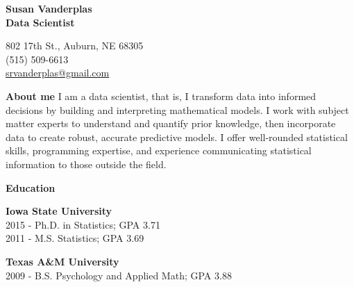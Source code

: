 \documentclass[letterpaper,12pt,final]{memoir}
\newcommand{\MedSep}{\vspace{1em}}
\newcommand{\SmallSep}{\vspace{0.5em}}
\newenvironment{AboutMe}
	{\ignorespaces\textbf{\color{RoyalBlue} About me}}
	{\MedSep\ignorespacesafterend}
\newcommand{\CVSection}[1]
	{\Large\textbf{#1}\par
	\SmallSep\normalsize\normalfont}
\newcommand{\CVItem}[1]
	{\textbf{\color{RoyalBlue} #1}}
\begin{document}



\begin{minipage}[t]{.6\linewidth}
\Huge\bfseries {\color{RoyalBlue} Susan Vanderplas} \\
\Large\bfseries  Data Scientist 
\end{minipage}\hfill
\begin{minipage}[t]{.35\linewidth}
\begin{flushright}\small
\phantom{\Huge SVP}
802 17th St., Auburn, NE 68305 \\
(515) 509-6613\\
\url{srvanderplas@gmail.com} 
\end{flushright}
\end{minipage}

\normalsize\normalfont
\SmallSep
\begin{AboutMe}
I am a data scientist, that is, I transform data into informed decisions by building and interpreting mathematical models. 
I work with subject matter experts to understand and quantify prior knowledge, then incorporate data to create robust, accurate predictive models. 
I offer well-rounded statistical skills, programming expertise, and experience communicating statistical information to those outside the field. 
\end{AboutMe}

\CVSection{Education}
\begin{minipage}[t]{.35\linewidth}
\CVItem{Iowa State University}\\
2015 - Ph.D. in Statistics; GPA 3.71\\
2011 - M.S. Statistics; GPA 3.69
\end{minipage}\hfill
\begin{minipage}[t]{.5\linewidth}
\CVItem{Texas A\&M University}\\
2009 - B.S. Psychology and Applied Math; GPA 3.88
\end{minipage}\hfill
\MedSep
\end{document}
